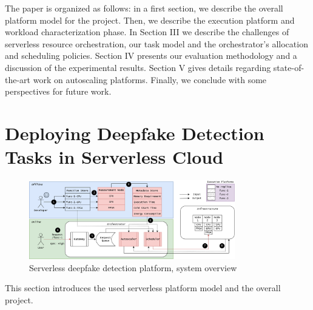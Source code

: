 The paper is organized as follows: in a first section, we describe the overall platform model for the project. Then, we describe the execution platform and workload characterization phase. In Section III we describe the challenges of serverless resource orchestration, our task model and the orchestrator's allocation and scheduling policies. Section IV presents our evaluation methodology and a discussion of the experimental results. Section V gives details regarding state-of-the-art work on autoscaling platforms. Finally, we conclude with some perspectives for future work.

\section{Deploying Deepfake Detection Tasks in Serverless Cloud}

\begin{figure}[t]
\centering
\includegraphics[width=0.8\textwidth]{5_Chapitre3/figures/placement.png}
\caption{Serverless deepfake detection platform, system overview}
\label{figure:herofake-placement}
\end{figure}

This section introduces the used serverless platform model and the overall project. %


